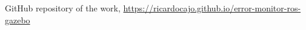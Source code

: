 \documentclass[runningheads]{llncs}
\begin{document}
\begin{thebibliography}{8}




GitHub repository of the work, \url{https://ricardocajo.github.io/error-monitor-ros-gazebo}
\end{thebibliography}
\end{document}
